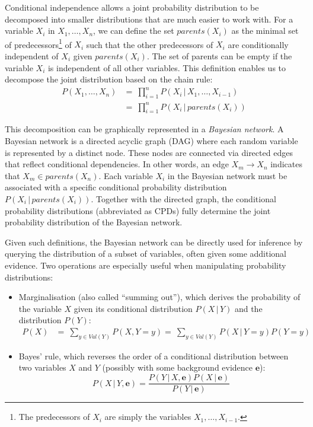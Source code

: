 Conditional independence allows a joint probability distribution to be decomposed into smaller distributions that are much easier to work with.  For a variable $X_i$ in $ X_1, \dots, X_n$, we can define the set $\mathit{parents}(X_i)$ as the minimal set of predecessors\footnote{The predecessors of $X_i$ are simply the variables $X_1,\dots, X_{i-1}$.} of $X_i$ such that the other predecessors of $X_i$ are conditionally independent of $X_i$ given $\mathit{parents}(X_i)$.  The set of parents can be empty if the variable $X_i$ is independent of all other variables. This definition enables us to decompose the joint distribution based on the chain rule:
\begin{align}
P(X_1, \dots, X_n) & = \ \prod_{i=1}^n P(X_i  \, | \,  X_1, \dots, X_{i-1}) \\
&= \ \prod_{i=1}^n P(X_i  \, | \,  \mathit{parents}(X_i)) 
\end{align}

This decomposition can be graphically represented in a \textit{Bayesian network}.  A Bayesian network is a directed acyclic graph (DAG) where each random variable is represented by a distinct node.  These nodes are connected via directed edges that reflect conditional dependencies. In other words, an edge $X_m \rightarrow X_n$ indicates that $X_m \in \mathit{parents}(X_n)$. Each variable $X_i$ in the Bayesian network must be associated with a specific conditional probability distribution $P(X_i  \, | \,  \mathit{parents}(X_i))$.   Together with the directed graph, the conditional probability distributions (abbreviated as CPDs) fully determine the joint probability distribution of the Bayesian network.   

Given such definitions, the Bayesian network can be directly used for inference by querying the distribution of a subset of variables, often given some additional evidence. Two operations are especially useful when manipulating probability distributions: 
\begin{itemize}
\item Marginalisation (also called ``summing out''), which derives the probability of the variable $X$ given its conditional distribution $P(X \, | \, Y)$ and the distribution $P(Y)$: 
\begin{align}
P(X) & = \ \sum_{y \in \mathit{Val}(Y)} P(X,Y = y) = \ \sum_{y \in \mathit{Val}(Y)} P(X \, | \, Y = y) P(Y = y)
\end{align}
\item Bayes' rule, which reverses the order of a conditional distribution between two variables $X$ and $Y$ (possibly with some background evidence $\mathbf{e}$): 
\begin{equation}
P(X \, | \, Y, \mathbf{e}) = \frac{P(Y \, | \, X, \mathbf{e}) P(X \, | \, \mathbf{e})} {P(Y \, | \, \mathbf{e})} \label{eq:genbayes}
\end{equation}
\end{itemize}

